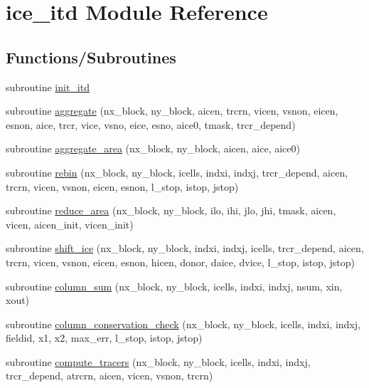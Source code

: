 \hypertarget{namespaceice__itd}{
\section{ice\_\-itd Module Reference}
\label{namespaceice__itd}
}
\subsection*{Functions/Subroutines}
\begin{DoxyCompactItemize}
\item 
subroutine \hyperlink{namespaceice__itd_a2c5da98ae0797cd69f98ffce134e4ef7}{init\_\-itd}
\item 
subroutine \hyperlink{namespaceice__itd_a8360ff94dd398d403890bfe9e8030b51}{aggregate} (nx\_\-block, ny\_\-block, aicen, trcrn, vicen, vsnon, eicen, esnon, aice, trcr, vice, vsno, eice, esno, aice0, tmask, trcr\_\-depend)
\item 
subroutine \hyperlink{namespaceice__itd_a428ffa5cfc4adb00cd323a2d76bf1c4d}{aggregate\_\-area} (nx\_\-block, ny\_\-block, aicen, aice, aice0)
\item 
subroutine \hyperlink{namespaceice__itd_a9c2920aedaba5102293185bec0142577}{rebin} (nx\_\-block, ny\_\-block, icells, indxi, indxj, trcr\_\-depend, aicen, trcrn, vicen, vsnon, eicen, esnon, l\_\-stop, istop, jstop)
\item 
subroutine \hyperlink{namespaceice__itd_aebf0bc54e5651ee1e36e7562ecaa4d73}{reduce\_\-area} (nx\_\-block, ny\_\-block, ilo, ihi, jlo, jhi, tmask, aicen, vicen, aicen\_\-init, vicen\_\-init)
\item 
subroutine \hyperlink{namespaceice__itd_aa67e5ce0b62a39a084d0058459df445e}{shift\_\-ice} (nx\_\-block, ny\_\-block, indxi, indxj, icells, trcr\_\-depend, aicen, trcrn, vicen, vsnon, eicen, esnon, hicen, donor, daice, dvice, l\_\-stop, istop, jstop)
\item 
subroutine \hyperlink{namespaceice__itd_acc3eccaeb97f8a721fd0b9127b1fa183}{column\_\-sum} (nx\_\-block, ny\_\-block, icells, indxi, indxj, nsum, xin, xout)
\item 
subroutine \hyperlink{namespaceice__itd_a6371b4812310c8ffbdf11c024b9e0c5a}{column\_\-conservation\_\-check} (nx\_\-block, ny\_\-block, icells, indxi, indxj, fieldid, x1, x2, max\_\-err, l\_\-stop, istop, jstop)
\item 
subroutine \hyperlink{namespaceice__itd_ae64b7540ec9e84001de195ffec097bc3}{compute\_\-tracers} (nx\_\-block, ny\_\-block, icells, indxi, indxj, trcr\_\-depend, atrcrn, aicen, vicen, vsnon, trcrn)

\end{DoxyCompactItemize}
